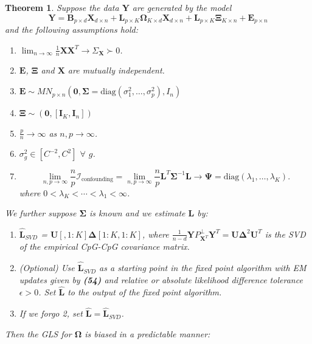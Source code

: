 \documentclass{article}
\newtheorem{theorem}{Theorem}[section]
\begin{document}
\begin{theorem}
Suppose the data $\bm{Y}$ are generated by the model
\begin{equation}
\bm{Y} = \bm{B}_{p \times d}\bm{X}_{d \times n} + \bm{L}_{p \times K} \bm{\Omega}_{K \times d}\bm{X}_{d \times n} + \bm{L}_{p \times K}\bm{\Xi}_{K \times n} + \bm{E}_{p \times n}
\end{equation}
and the following assumptions hold:
\begin{enumerate}
\item $\lim_{n \to \infty} \frac{1}{n}\bm{X}\bm{X}^T \to \Sigma_{\bm{X}} \succ 0$.
\item $\bm{E}$, $\bm{\Xi}$ and $\bm{X}$ are mutually independent.
\item $\bm{E} \sim MN_{p \times n}\left( \bm{0}, \bm{\Sigma} = \text{diag}\left( \sigma_1^2, \ldots, \sigma_p^2 \right), I_n \right)$
\item $\bm{\Xi} \sim \left( \bm{0}, \left[\bm{I}_K, \bm{I}_n\right] \right)$
\item $\frac{p}{n} \to \infty$ as $n, p \to \infty$.
\item $\sigma_{g}^2 \in \left[ C^{-2}, C^2 \right]$ $\forall$ $g$.
\item
\begin{equation}
\lim_{n, p \to \infty} \frac{n}{p}\mathcal{I}_{\text{confounding}} = \lim_{n, p \to \infty} \frac{n}{p} \bm{L}^T \bm{\Sigma}^{-1}\bm{L} \to \bm{\Psi} = \text{diag}\left( \lambda_1, \ldots, \lambda_K \right).
\end{equation}
where $0 < \lambda_K < \cdots < \lambda_1 < \infty$.
\end{enumerate}
We further suppose $\bm{\Sigma}$ is known and we estimate $\bm{L}$ by:
\begin{enumerate}
\item $\hat{\bm{L}}_{SVD}$ = $\bm{U}[,1:K]\bm{\Delta}[1:K,1:K]$, where $\frac{1}{n-d}\bm{Y}P_{\bm{X}^T}^{\perp}\bm{Y}^T = \bm{U}\bm{\Delta}^2\bm{U}^T$ is the SVD of the empirical CpG-CpG covariance matrix.
\item (Optional) Use $\hat{\bm{L}}_{SVD}$ as a starting point in the fixed point algorithm with EM updates given by \textbf{(54)} and relative or absolute likelihood difference tolerance $\epsilon > 0$. Set $\hat{\bm{L}}$ to the output of the fixed point algorithm.
\item If we forgo 2, set $\hat{\bm{L}} = \hat{\bm{L}}_{SVD}$.
\end{enumerate}
Then the GLS for $\bm{\Omega}$ is biased in a predictable manner:
\item \begin{equation}

\end{equation}
\end{theorem}
\end{document}
